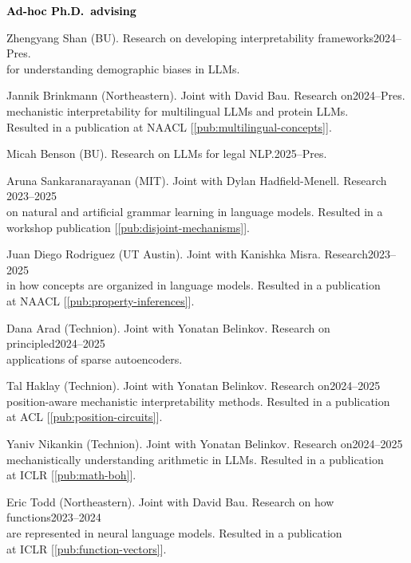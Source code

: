 \documentclass[10pt]{article}
\renewcommand{\subsection}[1]{\textcolor{black}{#1}}
\begin{document}
	\subsection{\textbf{Ad-hoc Ph.D.\ advising}}
	\begin{innerlist}
	\item Zhengyang Shan (BU). Research on developing interpretability frameworks\hfill 2024--Pres.\\
	      for understanding demographic biases in LLMs.
	\item Jannik Brinkmann (Northeastern). Joint with David Bau. Research on\hfill 2024--Pres.\\
	      mechanistic interpretability for multilingual LLMs and protein LLMs.\\Resulted
		  in a publication at NAACL [\ref{pub:multilingual-concepts}].
	\item Micah Benson (BU). Research on LLMs for legal NLP.\hfill 2025--Pres.
	\item Aruna Sankaranarayanan (MIT). Joint with Dylan Hadfield-Menell. Research \hfill 2023--2025\\
	on natural and artificial grammar learning in language models. Resulted in a\\workshop publication [\ref{pub:disjoint-mechanisms}].
	\item Juan Diego Rodriguez (UT Austin). Joint with Kanishka Misra. Research\hfill 2023--2025\\
	in how concepts are organized in language models. Resulted in a publication\\at NAACL [\ref{pub:property-inferences}].
	\item Dana Arad (Technion). Joint with Yonatan Belinkov. Research on principled\hfill 2024--2025\\applications of sparse autoencoders.
	\item Tal Haklay (Technion). Joint with Yonatan Belinkov. Research on\hfill 2024--2025\\position-aware mechanistic interpretability methods.
	      Resulted in a publication\\at ACL [\ref{pub:position-circuits}].
	\item Yaniv Nikankin (Technion). Joint with Yonatan Belinkov. Research on\hfill 2024--2025\\mechanistically understanding arithmetic in LLMs.
	      Resulted in a publication\\at ICLR [\ref{pub:math-boh}].
	\item Eric Todd (Northeastern). Joint with David Bau. Research on how functions\hfill 2023--2024\\are
		  represented in neural language models. Resulted in a publication\\at ICLR [\ref{pub:function-vectors}].
	\end{innerlist}
\end{document}
